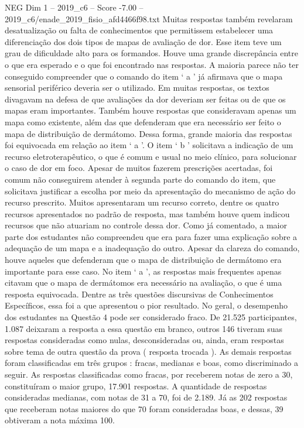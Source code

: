 \begin{textsample}{NEG Dim 1 – 2019\_c6 – Score -7.00 – 2019\_c6/enade\_2019\_fisio\_afd4466f98.txt}
Muitas respostas também revelaram desatualização ou falta de conhecimentos que permitissem estabelecer uma diferenciação dos dois tipos de mapas de avaliação de dor.
Esse item teve um grau de dificuldade alto para os formandos.
Houve uma grande discrepância entre o que era esperado e o que foi encontrado nas respostas.
A maioria parece não ter conseguido compreender que o comando do item ‘ a ’ já afirmava que o mapa sensorial periférico deveria ser o utilizado.
Em muitas respostas, os textos divagavam na defesa de que avaliações da dor deveriam ser feitas ou de que os mapas eram importantes.
Também houve respostas que consideravam apenas um mapa como existente, além das que defenderam que era necessário ser feito o mapa de distribuição de dermátomo.
Dessa forma, grande maioria das respostas foi equivocada em relação ao item ‘ a ’.
O item ‘ b ’ solicitava a indicação de um recurso eletroterapêutico, o que é comum e usual no meio clínico, para solucionar o caso de dor em foco.
Apesar de muitos fazerem prescrições acertadas, foi comum não conseguirem atender à segunda parte do comando do item, que solicitava justificar a escolha por meio da apresentação do mecanismo de ação do recurso prescrito.
Muitos apresentaram um recurso correto, dentre os quatro recursos apresentados no padrão de resposta, mas também houve quem indicou recursos que não atuariam no controle dessa dor.
Como já comentado, a maior parte dos estudantes não compreendeu que era para fazer uma explicação sobre a adequação de um mapa e a inadequação do outro.
Apesar da clareza do comando, houve aqueles que defenderam que o mapa de distribuição de dermátomo era importante para esse caso.
No item ‘ a ’, as respostas mais frequentes apenas citavam que o mapa de dermátomos era necessário na avaliação, o que é uma resposta equivocada.
Dentre as três questões discursivas de Conhecimentos Específicos, essa foi a que apresentou o pior resultado.
No geral, o desempenho dos estudantes na Questão 4 pode ser considerado fraco.
De 21.525 participantes, 1.087 deixaram a resposta a essa questão em branco, outros 146 tiveram suas respostas consideradas como nulas, desconsideradas ou, ainda, eram respostas sobre tema de outra questão da prova ( resposta trocada ).
As demais respostas foram classificadas em três grupos : fracas, medianas e boas, como discriminado a seguir.
As respostas classificadas como fracas, por receberem notas de zero a 30, constituíram o maior grupo, 17.901 respostas.
A quantidade de respostas consideradas medianas, com notas de 31 a 70, foi de 2.189.
Já as 202 respostas que receberam notas maiores do que 70 foram consideradas boas, e dessas, 39 obtiveram a nota máxima 100.

\end{textsample}
